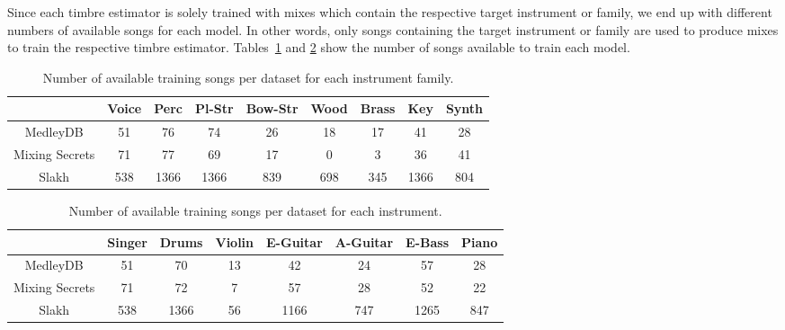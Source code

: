 Since each timbre estimator is solely trained with mixes which contain the respective target instrument or family, we end up with different numbers of available songs for each model. In other words, only songs containing the target instrument or family are used to produce mixes to train the respective timbre estimator. Tables~\ref{tab:numb-trainsongs-per-fam} and \ref{tab:numb-trainsongs-per-class} show the number of songs available to train each model. 
\begin{table}[]
	\centering
	\begin{tabular}{c|c|c|c|c|c|c|c|c}
		& Voice & Perc & Pl-Str & Bow-Str & Wood & Brass & Key & Synth \\ \hline
		MedleyDB	    & 51    & 76   & 74     & 26       & 18    & 17     & 41  & 28 \\ \hline
		Mixing Secrets	& 71    & 77   & 69     & 17       & 0    & 3     & 36   & 41 \\ \hline
		Slakh	        & 538   & 1366  & 1366    & 839     & 698  & 345   & 1366 & 804 \\
	\end{tabular}
	\caption{Number of available training songs per dataset for each instrument family.}
	\label{tab:numb-trainsongs-per-fam}
\end{table}
\begin{table}[]
	\centering
	\begin{tabular}{c|c|c|c|c|c|c|c}
		& Singer & Drums & Violin & E-Guitar & A-Guitar & E-Bass & Piano \\ \hline
		MedleyDB	   & 51     & 70    & 13      & 42       & 24        & 57     & 28 \\ \hline
		Mixing Secrets & 71     & 72    & 7      & 57       & 28        & 52     & 22 \\ \hline
		Slakh	       & 538    & 1366   & 56     & 1166      & 747      & 1265    & 847 \\
	\end{tabular}
	\caption{Number of available training songs per dataset for each instrument.}
	\label{tab:numb-trainsongs-per-class}
\end{table}
